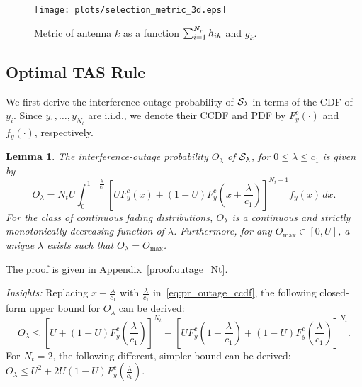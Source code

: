 \documentclass[12pt,draftcls,peerreview,onecolumn]{IEEEtran}
\newtheorem{lemma}{{\bf Lemma}}
\newcommand{\lam}{\lambda}
\newcommand{\Nt}{{N_t}}
\newcommand{\such}{h}
\newcommand{\puch}{g}
\newcommand{\hk}[1]{{\such_{#1}}}
\newcommand{\gk}[1]{{\puch_{#1}}}
\newcommand{\outmax}{O_{\text{max}}}
\newcommand{\cone}{c_{1}}
\newcommand{\out}{O}
\newcommand{\m}{\cone}
\newcommand{\lambym}{\frac{\lam}{\m}}
\newcommand{\yk}[1]{y_{#1}}
\newcommand{\un}{U}
\newcommand{\callamrule}{{\cal S_{{\lam}}}}
\newcommand{\outlam}{\out_{\lam}}
\begin{document}
\begin{figure}
\centering 
\texttt{[image: plots/selection\_metric\_3d.eps]}
\caption{Metric of antenna $k$ as a function $\sumnr\hk{ik}$ and $\gk{k}$.}
\label{fig:metric}
\end{figure}

\subsection{Optimal TAS Rule}
We first derive the interference-outage probability of $\callamrule$ in terms of the CDF of $\yk{i}$. Since $\yk{1},\ldots,\yk{\Nt}$ are i.i.d., we denote their CCDF and PDF by $F_{y}^{c}(\cdot)$ and $f_{y}(\cdot)$, respectively. 
\begin{lemma}
\label{lem:outage_Nt}
The interference-outage probability $\outlam$ of $\callamrule$, for $0\leq\lam\leq\cone$ is given by
\begin{equation}
\label{eq:pr_outage_ccdf} 
\outlam  =  \Nt\un \int_{0}^{1-\lambym} 	
\left[ \un F_{y}^{c}\left(x\right) + \left(1 -\un\right)F_{y}^{c}\left(x+\lambym\right) \right]^{\Nt-1} f_{y}(x)\,dx.
\end{equation}
For the class of continuous fading distributions, $\outlam$ is a continuous and strictly monotonically decreasing function of $\lam$. Furthermore, for any $\outmax\in[0,\un]$, a unique $\lam$ exists such that $\outlam=\outmax$. 
\end{lemma}
%
\begin{IEEEproof}
    The proof is given in Appendix~\ref{proof:outage_Nt}.
\end{IEEEproof}
%
{\em Insights:} Replacing $x+\lambym$ with $\lambym$ in~\eqref{eq:pr_outage_ccdf}, the following closed-form upper bound for $\outlam$ can be derived: 
\begin{equation}
\label{eq:pr_outage_ub}
\outlam  \leq \left[ \un + \left(1-\un\right)F_{y}^{c}\left(\lambym\right)  \right]^{\Nt} - \left[ \un F_{y}^{c}\left(1-\lambym\right) + \left(1-\un\right)F_{y}^{c}\left(\lambym\right)  \right]^{\Nt}.
\end{equation}
For $\Nt = 2$, the following different, simpler bound can be derived: $\outlam \leq \un^2 + 2\un(1-\un)F_{y}^{c}\left(\lambym\right)$.
\end{document}
